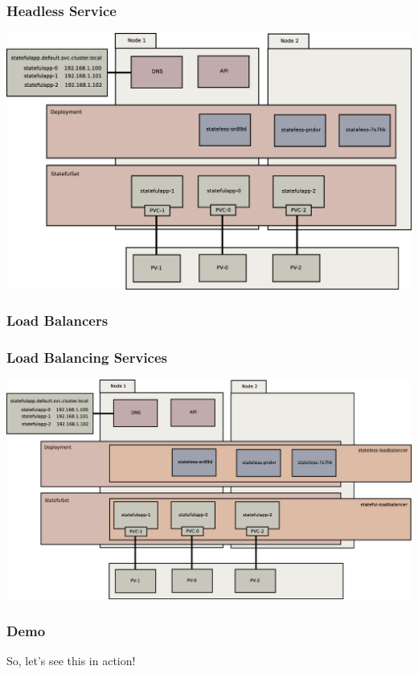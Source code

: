 \documentclass{beamer}
\begin{document}
\begin{frame}
    \frametitle{Headless Service}
    \includegraphics[width=\textwidth,height=0.85\textheight,keepaspectratio]{graphics/07-persistentIdentity.eps}
\end{frame}

\begin{frame}
    \frametitle{Load Balancers}
\end{frame}

\begin{frame}
    \frametitle{Load Balancing Services}
    \includegraphics[width=\textwidth,height=0.85\textheight,keepaspectratio]{graphics/08-loadBalancer.eps}
\end{frame}

\begin{frame}
    \frametitle{Demo}
    \begin{center}
        \Huge So, let's see this in action!
    \end{center}
\end{frame}
\end{document}
